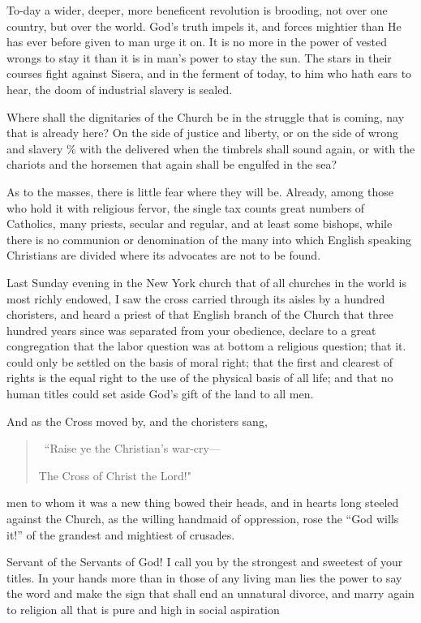 \documentclass{book}
\begin{document}
To-day a wider, deeper, more beneficent revolution is brooding, not over one country, but over the world. God’s truth impels it, and forces mightier than He has ever before given to man urge it on. It is no more in the power of vested wrongs to stay it than it is in man’s power to stay the sun. The stars in their courses fight against Sisera, and in the ferment of today, to him who hath ears to hear, the doom of industrial slavery is sealed.

Where shall the dignitaries of the Church be in the struggle that is coming, nay that is already here? On the side of justice and liberty, or on the side of wrong and slavery \% with the delivered when the timbrels shall sound again, or with the chariots and the horsemen that again shall be engulfed in the sea?

As to the masses, there is little fear where they will be. Already, among those who hold it with religious fervor, the single tax counts great numbers of Catholics, many priests, secular and regular, and at least some bishops, while there is no communion or denomination of the many into which English speaking Christians are divided where its advocates are not to be found.

Last Sunday evening in the New York church that of all churches in the world is most richly endowed, I saw the cross carried through its aisles by a hundred choristers, and heard a priest of that English branch of the Church that three hundred years since was separated from your obedience, declare to a great congregation that the labor question was at bottom a religious question; that it. could only be settled on the basis of moral right; that the first and clearest of rights is the equal right to the use of the physical basis of all life; and that no human titles could set aside God’s gift of the land to all men.

And as the Cross moved by, and the choristers sang,

\begin{quotation}\
	“Raise ye the Christian’s war-cry—

	The Cross of Christ the Lord!"

\end{quotation}

men to whom it was a new thing bowed their heads, and in hearts long steeled against the Church, as the willing handmaid of oppression, rose the “God wills it!” of the grandest and mightiest of crusades.

Servant of the Servants of God! I call you by the strongest and sweetest of your titles. In your hands more than in those of any living man lies the power to say the word and make the sign that shall end an unnatural divorce, and marry again to religion all that is pure and high in social aspiration
\end{document}
